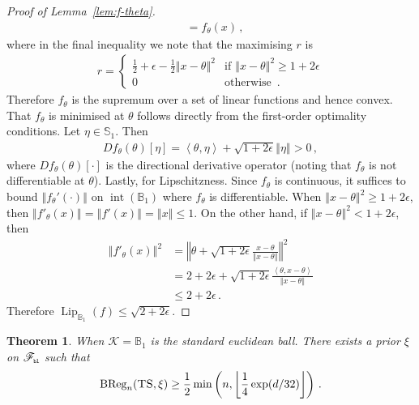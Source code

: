 \documentclass[letter, 12pt]{report}
\newcommand{\pb}{\text{\tiny\texttt{b}}}
\newcommand{\pl}{\text{\tiny\texttt{l}}}
\newcommand{\floor}[1]{\left\lfloor #1 \right\rfloor}
\newcommand{\ip}[1]{\left \langle #1 \right \rangle}
\newcommand{\BReg}{\textrm{BReg}}
\newcommand{\sphere}{\mathbb{S}}
\newcommand{\ball}{\mathbb{B}}
\newcommand{\norm}[1]{\left \Vert  #1 \right \Vert}
\newcommand{\cK}{\mathcal K}
\newcommand{\sF}{\mathscr F}
\newcommand{\lip}{\operatorname{Lip}}
\newcommand{\interior}{\operatorname{int}}
\newcommand{\1}{\mathbf{1}}
\newcommand{\ts}{\textsc{TS}\xspace}
\theoremstyle{plain}
\newtheorem{theorem}{Theorem}
\theoremstyle{definition}
\theoremstyle{remark}
\begin{document}
\begin{proof}[Proof of Lemma~\ref{lem:f-theta}]
\begin{align}
         & = f_\theta(x) \,,\nonumber
    \end{align}
    where in the final inequality we note that the maximising $r$ is
    \begin{align*}
        r = \begin{cases}
                \frac{1}{2} + \epsilon - \frac{1}{2}\norm{x - \theta}^2 & \text{if } \norm{x - \theta}^2 \geq 1 + 2\epsilon \\
                0                                                       & \text{otherwise } \,.
            \end{cases}
    \end{align*}
    Therefore $f_\theta$ is the supremum over a set of linear functions and hence convex.
    That $f_\theta$ is minimised at $\theta$ follows directly from the first-order optimality conditions.
    Let $\eta \in \sphere_1$. Then
    \begin{align*}
        Df_\theta(\theta)[\eta] = \ip{\theta, \eta} + \sqrt{1 + 2 \epsilon} \norm{\eta} > 0 \,,
    \end{align*}
    where $Df_\theta(\theta)[\cdot]$ is the directional derivative operator (noting that $f_\theta$ is not differentiable at $\theta$).
    Lastly, for Lipschitzness. Since $f_\theta$ is continuous, it suffices to bound $\norm{f_\theta'(\cdot)}$ on $\interior(\ball_1)$ where $f_\theta$ is
    differentiable.
    When $\norm{x - \theta}^2 \geq 1 + 2 \epsilon$, then $\norm{f'_\theta(x)} = \norm{f'(x)} = \norm{x} \leq 1$.
    On the other hand, if $\norm{x - \theta}^2 < 1 + 2 \epsilon$, then
    \begin{align*}
        \norm{f'_\theta(x)}^2
         & = \norm{\theta + \sqrt{1 + 2\epsilon} \frac{x - \theta}{\norm{x - \theta}}}^2            \\
         & = 2 + 2\epsilon + \sqrt{1 + 2\epsilon} \frac{\ip{\theta, x - \theta}}{\norm{x - \theta}} \\
         & \leq 2 + 2\epsilon \,.
    \end{align*}
    Therefore $\lip_{\ball_1}(f) \leq \sqrt{2 + 2\epsilon}$.
\end{proof}

\begin{theorem}\label{thm:ts-lower}
    When $\cK = \ball_1$ is the standard euclidean ball.
    There exists a prior $\xi$ on $\sF_{\pb\pl}$ such that
    \begin{align*}
        \BReg_n(\ts, \xi) \geq \frac12 \min\left(n, \floor{\frac{1}{4} \exp(d/32)}\right)\,.
    \end{align*}
\end{theorem}
\end{document}
